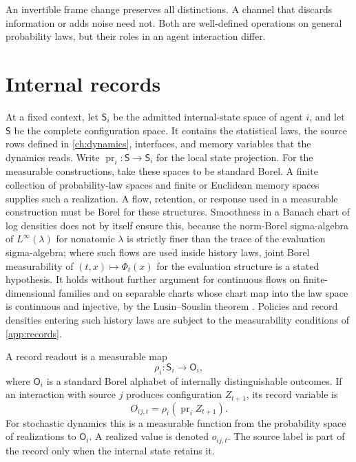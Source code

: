 An invertible frame change preserves all distinctions. A channel that discards information or adds noise need not. Both are well-defined operations on general probability laws, but their roles in an agent interaction differ.

\section{Internal records}

At a fixed context, let $\mathsf S_i$ be the admitted internal-state space of agent $i$, and let $\mathsf S$ be the complete configuration space. It contains the statistical laws, the source rows defined in \cref{ch:dynamics}, interfaces, and memory variables that the dynamics reads. Write $\operatorname{pr}_i:\mathsf S\to\mathsf S_i$ for the local state projection. For the measurable constructions, take these spaces to be standard Borel. A finite collection of probability-law spaces and finite or Euclidean memory spaces supplies such a realization. A flow, retention, or response used in a measurable construction must be Borel for these structures. Smoothness in a Banach chart of log densities does not by itself ensure this, because the norm-Borel sigma-algebra of $L^\infty(\lambda)$ for nonatomic $\lambda$ is strictly finer than the trace of the evaluation sigma-algebra; where such flows are used inside history laws, joint Borel measurability of $(t,x)\mapsto\Phi_t(x)$ for the evaluation structure is a stated hypothesis. It holds without further argument for continuous flows on finite-dimensional families and on separable charts whose chart map into the law space is continuous and injective, by the Lusin--Souslin theorem \citep[Theorem~15.1]{Kechris1995}. Policies and record densities entering such history laws are subject to the measurability conditions of \cref{app:records}.

A record readout is a measurable map
\begin{equation}
\rho_i:\mathsf S_i\longrightarrow\mathsf O_i,
\label{eq:record-readout}
\end{equation}
where $\mathsf O_i$ is a standard Borel alphabet of internally distinguishable outcomes. If an interaction with source $j$ produces configuration $Z_{t+1}$, its record variable is
\begin{equation}
O_{ij,t}=\rho_i(\operatorname{pr}_i Z_{t+1}).
\label{eq:record-variable}
\end{equation}
For stochastic dynamics this is a measurable function from the probability space of realizations to $\mathsf O_i$. A realized value is denoted $o_{ij,t}$. The source label is part of the record only when the internal state retains it.

